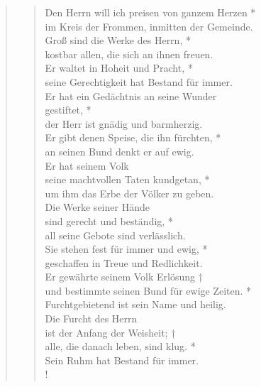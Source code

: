
\begin{quote}
\begin{verse}

Den Herrn will ich preisen von ganzem Herzen *\\
im Kreis der Frommen, inmitten der Gemeinde.\\
\vin Groß sind die Werke des Herrn, *\\
\vin kostbar allen, die sich an ihnen freuen.\\
Er waltet in Hoheit und Pracht, *\\
seine Gerechtigkeit hat Bestand für immer.\\
\vin Er hat ein Gedächtnis an seine Wunder\\ 
\vin gestiftet, *\\
\vin der Herr ist gnädig und barmherzig.\\
Er gibt denen Speise, die ihn fürchten, *\\
an seinen Bund denkt er auf ewig.\\
\vin Er hat seinem Volk\\
\vin seine machtvollen Taten kundgetan, *\\
\vin um ihm das Erbe der Völker zu geben. \\
Die Werke seiner Hände\\
sind gerecht und beständig, *\\
all seine Gebote sind verlässlich.\\
\vin Sie stehen fest für immer und ewig, *\\
\vin geschaffen in Treue und Redlichkeit.\\
Er gewährte seinem Volk Erlösung †\\
und bestimmte seinen Bund für ewige Zeiten. *\\
Furchtgebietend ist sein Name und heilig. \\
\vin Die Furcht des Herrn\\ 
\vin ist der Anfang der Weisheit; †\\
\vin alle, die danach leben, sind klug. *\\
\vin Sein Ruhm hat Bestand für immer.\\!

\end{verse}
 
\end{quote}

\vspace{0.3cm}


